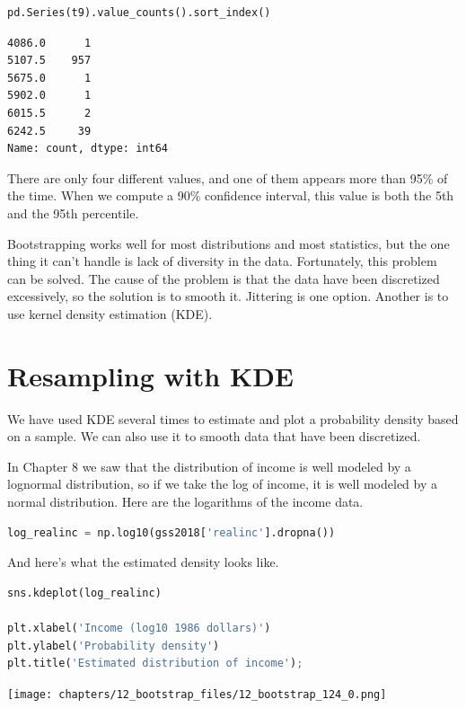 \begin{lstlisting}[language=Python,style=source]
pd.Series(t9).value_counts().sort_index()
\end{lstlisting}

\begin{lstlisting}[style=output]
4086.0      1
5107.5    957
5675.0      1
5902.0      1
6015.5      2
6242.5     39
Name: count, dtype: int64
\end{lstlisting}

There are only four different values, and one of them appears more than
95\% of the time. When we compute a 90\% confidence interval, this value
is both the 5th and the 95th percentile.

Bootstrapping works well for most distributions and most statistics, but
the one thing it can't handle is lack of diversity in the data.
Fortunately, this problem can be solved. The cause of the problem is
that the data have been discretized excessively, so the solution is to
smooth it. Jittering is one option. Another is to use kernel density
estimation (KDE).

\hypertarget{resampling-with-kde}{%
\section{Resampling with KDE}\label{resampling-with-kde}}

We have used KDE several times to estimate and plot a probability
density based on a sample. We can also use it to smooth data that have
been discretized.

In Chapter 8 we saw that the distribution of income is well modeled by a
lognormal distribution, so if we take the log of income, it is well
modeled by a normal distribution. Here are the logarithms of the income
data.

\begin{lstlisting}[language=Python,style=source]
log_realinc = np.log10(gss2018['realinc'].dropna())
\end{lstlisting}

And here's what the estimated density looks like.

\begin{lstlisting}[language=Python,style=source]
sns.kdeplot(log_realinc)

plt.xlabel('Income (log10 1986 dollars)')
plt.ylabel('Probability density')
plt.title('Estimated distribution of income');
\end{lstlisting}

\begin{center}
\texttt{[image: chapters/12\_bootstrap\_files/12\_bootstrap\_124\_0.png]}
\end{center}


